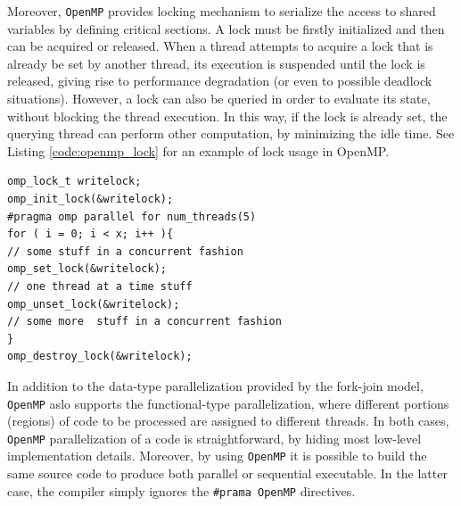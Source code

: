 Moreover, \texttt{OpenMP} provides locking mechanism to serialize the access to shared variables by defining critical sections.
A lock must be firstly  initialized and then can be acquired or released. When a thread  attempts to acquire a lock that is already be set by another
thread, its execution is suspended until the lock is released,
giving rise to performance degradation (or even to possible deadlock
situations). 
However, a lock can also be queried in order to
evaluate its state, without blocking the thread execution. In this
way, if the lock is already set, the querying thread can perform
other computation, by minimizing the idle time. See Listing \ref{code:openmp_lock} for an example of lock usage in OpenMP.

\begin{lstlisting}
omp_lock_t writelock;
omp_init_lock(&writelock);
#pragma omp parallel for num_threads(5)
for ( i = 0; i < x; i++ ){
// some stuff in a concurrent fashion
omp_set_lock(&writelock);
// one thread at a time stuff
omp_unset_lock(&writelock);
// some more  stuff in a concurrent fashion
}    
omp_destroy_lock(&writelock);
\end{lstlisting}
    

    In addition to the data-type parallelization provided by the
    fork-join model, \texttt{OpenMP} aslo supports the functional-type
    parallelization, where different portions (regions) of code to be
    processed are assigned to different threads. In both cases, \texttt{OpenMP}
    parallelization of a code is straightforward, by hiding most
    low-level implementation details. Moreover, by using \texttt{OpenMP} it is
    possible to build the same source code to produce both parallel or
    sequential executable. In the latter case, the compiler simply
    ignores the \texttt{#prama OpenMP} directives.
    
